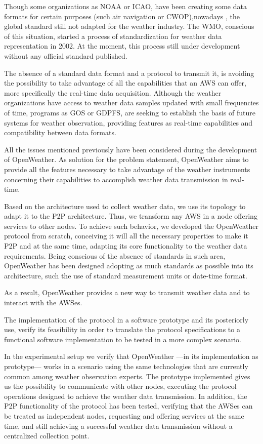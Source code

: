 Though some organizations as \gls{NOAA} or \gls{ICAO}, have been creating some data formats for certain purposes (such air navigation or \gls{CWOP}),nowadays , the global standard still not adapted for the weather industry. The \gls{WMO}, conscious of this situation, started a process of standardization for weather data representation in 2002. At the moment, this process still under development without any official standard published.

The absence of a standard data format and a protocol to transmit it, is avoiding the possibility to take advantage of all the capabilities that an \gls{AWS} can offer, more specifically the real-time data acquisition. Although the weather organizations have access to weather data samples updated with small frequencies of time, programs as \gls{GOS} or \gls{GDPFS}, are seeking to establish the basis of future systems for weather observation, providing features as real-time capabilities and compatibility between data formats.

All the issues mentioned previously have been considered during the development of OpenWeather. As solution for the problem statement, OpenWeather aims to provide all the features necessary to take advantage of the weather instruments concerning their capabilities to accomplish weather data transmission in real-time.

Based on the architecture used to collect weather data, we use its topology to adapt it to the \gls{P2P} architecture. Thus, we transform any \gls{AWS} in a node offering services to other nodes. To achieve such behavior, we developed the OpenWeather protocol from scratch, conceiving it will all the necessary properties to make it \gls{P2P} and at the same time, adapting its core functionality to the weather data requirements. Being conscious of the absence of standards in such area, OpenWeather has been designed adopting as much standards as possible into its architecture, such the use of standard measurement units or date-time format.

As a result, OpenWeather provides a new way to transmit weather data and to interact with the \gls{AWS}es. 

The implementation of the protocol in a software prototype and its posteriorly use, verify its feasibility in order to translate the protocol specifications to a functional software implementation to be tested in a more complex scenario.

In the experimental setup we verify that OpenWeather —in its implementation as prototype— works in a scenario using the same technologies that are currently common among weather observation experts. The prototype implemented gives us the possibility to communicate with other nodes, executing the protocol operations designed to achieve the weather data transmission. In addition, the \gls{P2P} functionality of the protocol has been tested, verifying that the \gls{AWS}es can be treated as independent nodes, requesting and offering services at the same time, and still achieving a successful weather data transmission without a centralized collection point.

